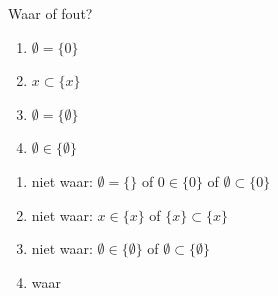 \begin{oef}
Waar of fout?
\begin{enumerate}
\item $\emptyset=\{0\}$
\item $x\subset \{x\}$
\item $\emptyset=\{\emptyset\}$
\item $\emptyset\in \{\emptyset\}$
\end{enumerate}
\begin{opl}
\begin{enumerate}
\item niet waar: $\emptyset=\{ \}$ of  $0\in \{0\}$ of $\emptyset\subset\{0\}$
\item niet waar: $x\in \{x\}$ of $\{x\}\subset \{x\}$
\item niet waar: $\emptyset\in\{\emptyset\}$ of $\emptyset\subset\{\emptyset\}$
\item waar
\end{enumerate}
\end{opl}
\end{oef}




